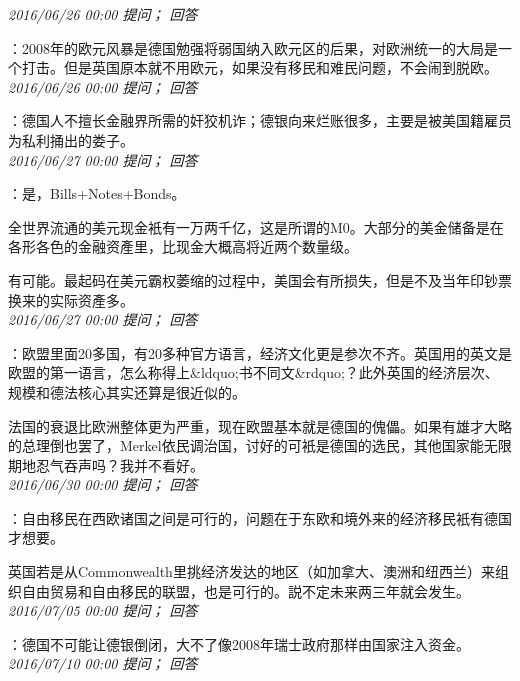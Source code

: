 \documentclass[twocolumn]{ctexart}
\begin{document}
\textit{\hfill\noindent\small 2016/06/26 00:00 提问； 回答}

：2008年的欧元风暴是德国勉强将弱国纳入欧元区的后果，对欧洲统一的大局是一个打击。但是英国原本就不用欧元，如果没有移民和难民问题，不会闹到脱欧。\\

\textit{\hfill\noindent\small 2016/06/26 00:00 提问； 回答}

：德国人不擅长金融界所需的奸狡机诈；德银向来烂账很多，主要是被美国籍雇员为私利捅出的娄子。\\

\textit{\hfill\noindent\small 2016/06/27 00:00 提问； 回答}

：是，Bills+Notes+Bonds。

全世界流通的美元现金衹有一万两千亿，这是所谓的M0。大部分的美金储备是在各形各色的金融资產里，比现金大概高将近两个数量级。

有可能。最起码在美元霸权萎缩的过程中，美国会有所损失，但是不及当年印钞票换来的实际资產多。\\

\textit{\hfill\noindent\small 2016/06/27 00:00 提问； 回答}

：欧盟里面20多国，有20多种官方语言，经济文化更是参次不齐。英国用的英文是欧盟的第一语言，怎么称得上\&ldquo;书不同文\&rdquo;？此外英国的经济层次、规模和德法核心其实还算是很近似的。

法国的衰退比欧洲整体更为严重，现在欧盟基本就是德国的傀儡。如果有雄才大略的总理倒也罢了，Merkel依民调治国，讨好的可衹是德国的选民，其他国家能无限期地忍气吞声吗？我并不看好。\\

\textit{\hfill\noindent\small 2016/06/30 00:00 提问； 回答}

：自由移民在西欧诸国之间是可行的，问题在于东欧和境外来的经济移民衹有德国才想要。

英国若是从Commonwealth里挑经济发达的地区（如加拿大、澳洲和纽西兰）来组织自由贸易和自由移民的联盟，也是可行的。説不定未来两三年就会发生。\\

\textit{\hfill\noindent\small 2016/07/05 00:00 提问； 回答}

：德国不可能让德银倒闭，大不了像2008年瑞士政府那样由国家注入资金。\\

\textit{\hfill\noindent\small 2016/07/10 00:00 提问； 回答}
\end{document}
